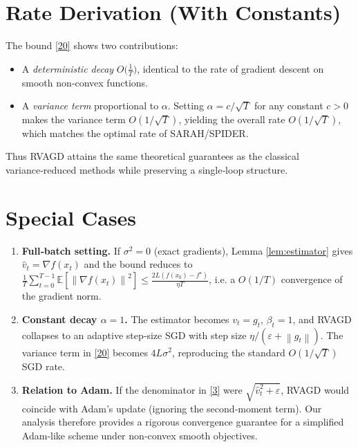 \documentclass[11pt]{article}
\newcommand{\EE}{\mathbb{E}}
\newcommand{\norm}[1]{\left\|#1\right\|}
\newcommand{\grad}{\nabla}
\begin{document}
\section*{Rate Derivation (With Constants)}
The bound \eqref{20} shows two contributions:
\begin{itemize}
\item A \emph{deterministic decay} $O\!\bigl(\tfrac{1}{T}\bigr)$, identical to the
      rate of gradient descent on smooth non‑convex functions.
\item A \emph{variance term} proportional to $\alpha$.
      Setting $\alpha = c/\sqrt{T}$ for any constant $c>0$ makes the variance term
      $O(1/\sqrt{T})$, yielding the overall rate $O(1/\sqrt{T})$,
      which matches the optimal rate of SARAH/SPIDER.
\end{itemize}
Thus RVAGD attains the same theoretical guarantees as the classical variance‑reduced
methods while preserving a single‑loop structure.

\section*{Special Cases}
\begin{enumerate}[leftmargin=*]
\item \textbf{Full‑batch setting.}
      If $\sigma^{2}=0$ (exact gradients), Lemma \ref{lem:estimator} gives
      $\hat v_{t}=\grad f(x_{t})$ and the bound reduces to
      $\frac{1}{T}\sum_{t=0}^{T-1}\EE[\norm{\grad f(x_{t})}^{2}]
        \le\frac{2L(f(x_{0})-f^{\star})}{\eta T}$,
      i.e. a $O(1/T)$ convergence of the gradient norm.
\item \textbf{Constant decay $\alpha=1$.}
      The estimator becomes $v_{t}=g_{t}$, $\beta_{t}=1$, and RVAGD collapses to
      an adaptive step‑size SGD with step size $\eta/(\varepsilon+\norm{g_{t}})$.
      The variance term in \eqref{20} becomes $4L\sigma^{2}$, reproducing the
      standard $O(1/\sqrt{T})$ SGD rate.
\item \textbf{Relation to Adam.}
      If the denominator in \eqref{3} were $\sqrt{\hat v_{t}^{2}+\varepsilon}$,
      RVAGD would coincide with Adam’s update (ignoring the second‑moment term).
      Our analysis therefore provides a rigorous convergence guarantee for a
      simplified Adam‑like scheme under non‑convex smooth objectives.
\end{enumerate}
\end{document}
